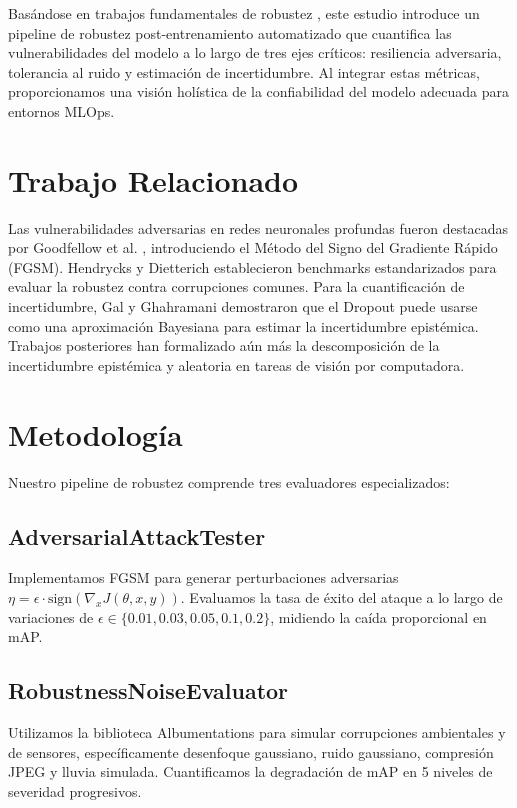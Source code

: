 \documentclass[conference]{IEEEtran}
\begin{document}
Basándose en trabajos fundamentales de robustez \cite{madry2018towards, carlini2017towards}, este estudio introduce un pipeline de robustez post-entrenamiento automatizado que cuantifica las vulnerabilidades del modelo a lo largo de tres ejes críticos: resiliencia adversaria, tolerancia al ruido y estimación de incertidumbre. Al integrar estas métricas, proporcionamos una visión holística de la confiabilidad del modelo adecuada para entornos MLOps.

\section{Trabajo Relacionado}
Las vulnerabilidades adversarias en redes neuronales profundas fueron destacadas por Goodfellow et al. \cite{goodfellow2015fgsm}, introduciendo el Método del Signo del Gradiente Rápido (FGSM). Hendrycks y Dietterich \cite{hendrycks2019benchmarking} establecieron benchmarks estandarizados para evaluar la robustez contra corrupciones comunes. Para la cuantificación de incertidumbre, Gal y Ghahramani \cite{gal2016dropout} demostraron que el Dropout puede usarse como una aproximación Bayesiana para estimar la incertidumbre epistémica. Trabajos posteriores \cite{kendall2017uncertainties, lakshminarayanan2017simple} han formalizado aún más la descomposición de la incertidumbre epistémica y aleatoria en tareas de visión por computadora.

\section{Metodología}
Nuestro pipeline de robustez comprende tres evaluadores especializados:

\subsection{AdversarialAttackTester}
Implementamos FGSM para generar perturbaciones adversarias $\eta = \epsilon \cdot \text{sign}(\nabla_x J(\theta, x, y))$. Evaluamos la tasa de éxito del ataque a lo largo de variaciones de $\epsilon \in \{0.01, 0.03, 0.05, 0.1, 0.2\}$, midiendo la caída proporcional en mAP.

\subsection{RobustnessNoiseEvaluator}
Utilizamos la biblioteca Albumentations para simular corrupciones ambientales y de sensores, específicamente desenfoque gaussiano, ruido gaussiano, compresión JPEG y lluvia simulada. Cuantificamos la degradación de mAP en 5 niveles de severidad progresivos.
\end{document}
